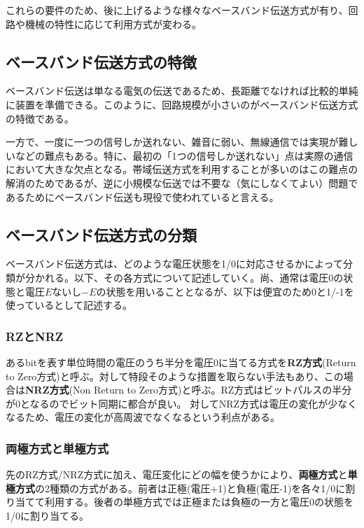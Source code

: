 これらの要件のため、後に上げるような様々なベースバンド伝送方式が有り、回路や機械の特性に応じて利用方式が変わる。

\subsection{ベースバンド伝送方式の特徴}
ベースバンド伝送は単なる電気の伝送であるため、長距離でなければ比較的単純に装置を準備できる。このように、回路規模が小さいのがベースバンド伝送方式の特徴である。

一方で、一度に一つの信号しか送れない、雑音に弱い、無線通信では実現が難しいなどの難点もある。特に、最初の「1つの信号しか送れない」点は実際の通信において大きな欠点となる。帯域伝送方式を利用することが多いのはこの難点の解消のためであるが、逆に小規模な伝送では不要な（気にしなくてよい）問題であるためにベースバンド伝送も現役で使われていると言える。

\subsection{ベースバンド伝送方式の分類}
ベースバンド伝送方式は、どのような電圧状態を1/0に対応させるかによって分類が分かれる。以下、その各方式について記述していく。尚、通常は電圧0の状態と電圧$E$ないし$-E$の状態を用いることとなるが、以下は便宜のため0と1/-1を使っているとして記述する。

\subsubsection{RZとNRZ}
あるbitを表す単位時間の電圧のうち半分を電圧0に当てる方式を\textbf{RZ方式}(Return to Zero方式)と呼ぶ。対して特段そのような措置を取らない手法もあり、この場合は\textbf{NRZ方式}(Non Return to Zero方式)と呼ぶ。RZ方式はビットパルスの半分が0となるのでビット同期に都合が良い。	対してNRZ方式は電圧の変化が少なくなるため、電圧の変化が高周波でなくなるという利点がある。
  

\subsubsection{両極方式と単極方式}
先のRZ方式/NRZ方式に加え、電圧変化にどの幅を使うかにより、\textbf{両極方式}と\textbf{単極方式}の2種類の方式がある。前者は正極(電圧+1)と負極(電圧-1)を各々1/0に割り当てて利用する。後者の単極方式では正極または負極の一方と電圧0の状態を1/0に割り当てる。

